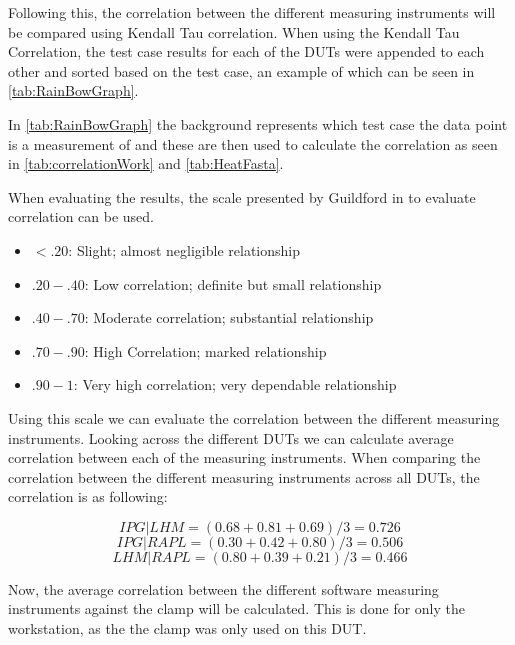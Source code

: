 Following this, the correlation between the different measuring instruments will be compared using Kendall Tau correlation. When using the Kendall Tau Correlation, the test case results for each of the DUTs were appended to each other and sorted based on the test case, an example of which can be seen in \cref{tab:RainBowGraph}.



In \cref{tab:RainBowGraph} the background represents which test case the data point is a measurement of and these are then used to calculate the correlation as seen in \cref{tab:correlationWork} and \cref{tab:HeatFasta}.



% 
% 

When evaluating the results, the scale presented by Guildford in \cite[219]{guilford1950fundamental} to evaluate correlation can be used.

\begin{itemize}
    \item $<.20$: Slight; almost negligible relationship
    \item $.20-.40$: Low correlation; definite but small relationship
    \item $.40-.70$: Moderate correlation; substantial relationship
    \item $.70-.90$: High Correlation; marked relationship
    \item $.90-1$: Very high correlation; very dependable relationship
\end{itemize}

Using this scale we can evaluate the correlation between the different measuring instruments. Looking across the different DUTs we can calculate average correlation between each of the measuring instruments. When comparing the correlation between the different measuring instruments across all DUTs, the correlation is as following:

$$IPG|LHM = (0.68+0.81+0.69)/3 = 0.726$$
$$IPG|RAPL = (0.30+0.42+0.80)/3 = 0.506$$
$$LHM|RAPL = (0.80+0.39+0.21)/3 = 0.466$$

Now, the average correlation between the different software measuring instruments against the clamp will be calculated. This is done for only the workstation, as the the clamp was only used on this DUT.

